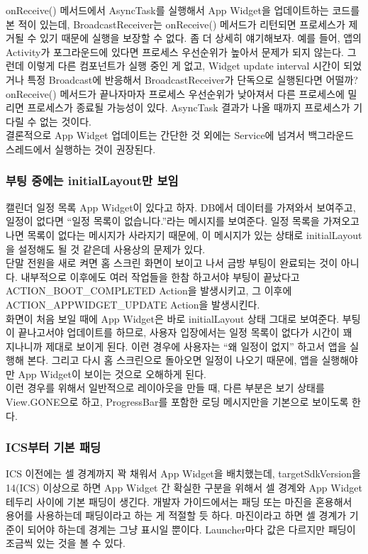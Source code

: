 onReceive() 메서드에서 AsyncTask를 실행해서 App Widget을 업데이트하는 코드를 본 적이 있는데, BroadcastReceiver는 onReceive() 메서드가 리턴되면 프로세스가 제거될 수 있기 때문에 실행을 보장할 수 없다.
좀 더 상세히 얘기해보자. 예를 들어, 앱의 Activity가 포그라운드에 있다면 프로세스 우선순위가 높아서 문제가 되지 않는다. 그런데 이렇게 다른 컴포넌트가 실행 중인 게 없고, Widget update interval 시간이 되었거나 특정 Broadcast에 반응해서 BroadcastReceiver가 단독으로 실행된다면 어떨까? 
onReceive() 메서드가 끝나자마자 프로세스 우선순위가 낮아져서 다른 프로세스에 밀리면 프로세스가 종료될 가능성이 있다. 
AsyncTask 결과가 나올 때까지 프로세스가 기다릴 수 없는 것이다.\\

결론적으로 App Widget 업데이트는 간단한 것 외에는 Service에 넘겨서 백그라운드 스레드에서 실행하는 것이 권장된다. 

\subsubsection{부팅 중에는 initialLayout만 보임}
캘린더 일정 목록 App Widget이 있다고 하자. 
DB에서 데이터를 가져와서 보여주고, 일정이 없다면 ``일정 목록이 없습니다.''라는 메시지를 보여준다.
일정 목록을 가져오고나면 목록이 없다는 메시지가 사라지기 때문에, 이 메시지가 있는 상태로 initialLayout을 설정해도 될 것 같은데 사용상의 문제가 있다.\\

단말 전원을 새로 켜면 홈 스크린 화면이 보이고 나서 금방 부팅이 완료되는 것이 아니다. 
내부적으로 이후에도 여러 작업들을 한참 하고서야 부팅이 끝났다고 ACTION\_BOOT\_COMPLETED Action을 발생시키고, 그 이후에 ACTION\_APPWIDGET\_UPDATE Action을 발생시킨다.\\

화면이 처음 보일 때에 App Widget은 바로 initialLayout 상태 그대로 보여준다. 부팅이 끝나고서야 업데이트를 하므로, 사용자 입장에서는 일정 목록이 없다가 시간이 꽤 지나니까 제대로 보이게 된다.
이런 경우에 사용자는 ``왜 일정이 없지'' 하고서 앱을 실행해 본다. 그리고 다시 홈 스크린으로 돌아오면 일정이 나오기 때문에, 앱을 실행해야만 App Widget이 보이는 것으로 오해하게 된다.\\

이런 경우를 위해서 일반적으로 레이아웃을 만들 때, 다른 부분은 보기 상태를 View.GONE으로 하고, ProgressBar를 포함한 로딩 메시지만을 기본으로 보이도록 한다.

\subsubsection{ICS부터 기본 패딩}
\label{subsubsec:icspadding}
ICS 이전에는 셀 경계까지 꽉 채워서 App Widget을 배치했는데, targetSdkVersion을 14(ICS) 이상으로 하면 App Widget 간 확실한 구분을 위해서 셀 경계와 App Widget 테두리 사이에 기본 패딩이 생긴다. 개발자 가이드에서는 패딩 또는 마진을 혼용해서 용어를 사용하는데 패딩이라고 하는 게 적절할 듯 하다. 마진이라고 하면 셀 경계가 기준이 되어야 하는데 경계는 그냥 표시일 뿐이다. Launcher마다 값은 다르지만 패딩이 조금씩 있는 것을 볼 수 있다.\\

